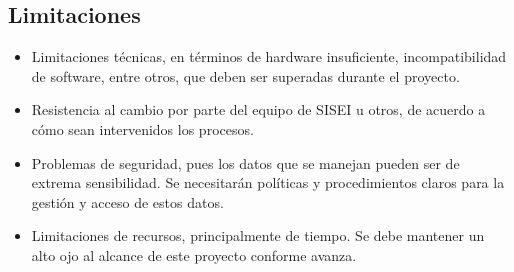 \subsection{Limitaciones}
\begin{itemize}
	\item Limitaciones técnicas, en términos de hardware insuficiente, incompatibilidad de software, entre otros, que deben ser superadas durante el proyecto.
	\item Resistencia al cambio por parte del equipo de SISEI u otros, de acuerdo a cómo sean intervenidos los procesos.
	\item Problemas de seguridad, pues los datos que se manejan pueden ser de extrema sensibilidad. Se necesitarán políticas y procedimientos claros para la gestión y acceso de estos datos.
	\item Limitaciones de recursos, principalmente de tiempo. Se debe mantener un alto ojo al alcance de este proyecto conforme avanza.
\end{itemize}
